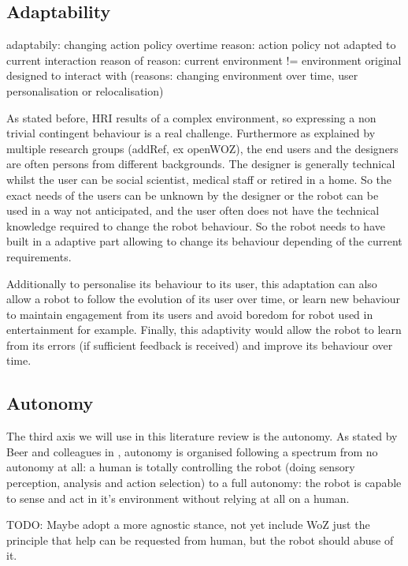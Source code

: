 	
	\subsection{Adaptability}	
	
	adaptabily: changing action policy overtime
	reason: action policy not adapted to current interaction
	reason of reason: current environment != environment original designed to interact with (reasons: changing environment over time, user personalisation or relocalisation)
	
	As stated before, HRI results of a complex environment, so expressing a non trivial contingent behaviour is a real challenge. Furthermore as explained by multiple research groups (addRef, ex openWOZ), the end users and the designers are often persons from different backgrounds. The designer is generally technical whilst the user can be social scientist, medical staff or retired in a home. So the exact needs of the users can be unknown by the designer or the robot can be used in a way not anticipated, and the user often does not have the technical knowledge required to change the robot behaviour. So the robot needs to have built in a adaptive part allowing to change its behaviour depending of the current requirements.
	
	Additionally to personalise its behaviour to its user, this adaptation can also allow a robot to follow the evolution of its user over time, or learn new behaviour to maintain engagement from its users and avoid boredom for robot used in entertainment for example. Finally, this adaptivity would allow the robot to learn from its errors (if sufficient feedback is received) and improve its behaviour over time.
		
		
	\subsection{Autonomy}

	The third axis we will use in this literature review is the autonomy. As stated by Beer and colleagues in \cite{beer2014toward}, autonomy is organised following a spectrum from no autonomy at all: a human is totally controlling the robot (doing sensory perception, analysis and action selection) to a full autonomy: the robot is capable to sense and act in it's environment without relying at all on a human.
	
	TODO: Maybe adopt a more agnostic stance, not yet include WoZ just the principle that help can be requested from human, but the robot should abuse of it.
	

